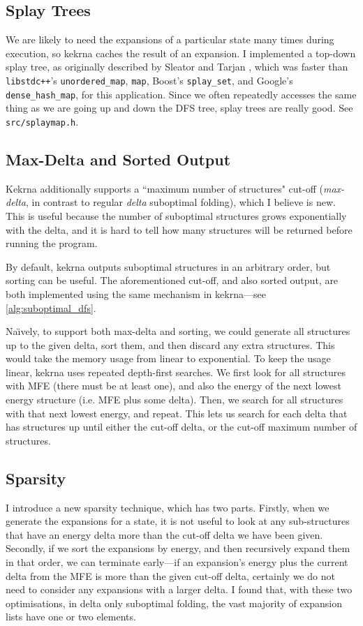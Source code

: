\documentclass{cshonours}
\begin{document}
\subsection{Splay Trees}
We are likely to need the expansions of a particular state many times during execution, so kekrna caches the result of an expansion. I implemented a top-down splay tree, as originally described by Sleator and Tarjan \cite{sleatorSplay}, which was faster than \texttt{libstdc++}'s \texttt{unordered\_map}, \texttt{map}, Boost's \texttt{splay\_set}, and Google's \texttt{dense\_hash\_map}, for this application. Since we often repeatedly accesses the same thing as we are going up and down the DFS tree, splay trees are really good. See \texttt{src/splaymap.h}.

\subsection{Max-Delta and Sorted Output}
Kekrna additionally supports a ``maximum number of structures" cut-off (\emph{max-delta}, in contrast to regular \emph{delta} suboptimal folding), which I believe is new. This is useful because the number of suboptimal structures grows exponentially with the delta, and it is hard to tell how many structures will be returned before running the program. 

By default, kekrna outputs suboptimal structures in an arbitrary order, but sorting can be useful. The aforementioned cut-off, and also sorted output, are both implemented using the same mechanism in kekrna---see \autoref{alg:suboptimal_dfs}.

Na\"{\i}vely, to support both max-delta and sorting, we could generate all structures up to the given delta, sort them, and then discard any extra structures. This would take the memory usage from linear to exponential. To keep the usage linear, kekrna uses repeated depth-first searches. We first look for all structures with MFE (there must be at least one), and also the energy of the next lowest energy structure (i.e. MFE plus some delta). Then, we search for all structures with that next lowest energy, and repeat. This lets us search for each delta that has structures up until either the cut-off delta, or the cut-off maximum number of structures.

\subsection{Sparsity}
I introduce a new sparsity technique, which has two parts. Firstly, when we generate the expansions for a state, it is not useful to look at any sub-structures that have an energy delta more than the cut-off delta we have been given. Secondly, if we sort the expansions by energy, and then recursively expand them in that order, we can terminate early---if an expansion's energy plus the current delta from the MFE is more than the given cut-off delta, certainly we do not need to consider any expansions with a larger delta. I found that, with these two optimisations, in delta only suboptimal folding, the vast majority of expansion lists have one or two elements.
\end{document}
